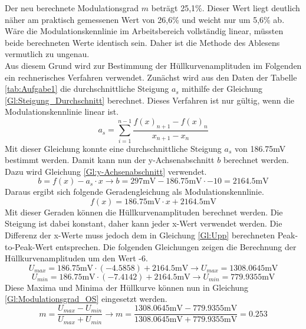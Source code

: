 \documentclass[12pt]{scrartcl}
\begin{document}
Der neu berechnete Modulationsgrad $m$ beträgt 25,1\%. Dieser Wert liegt deutlich näher am praktisch gemessenen Wert von 26,6\% und weicht nur um 5,6\% ab.\\
Wäre die Modulationskennlinie im Arbeitsbereich vollständig linear, müssten beide berechneten Werte identisch sein. 
Daher ist die Methode des Ablesens vermutlich zu ungenau. \\
Aus diesem Grund wird zur Bestimmung der Hüllkurvenamplituden im Folgenden ein rechnerisches Verfahren verwendet. 
Zunächst wird aus den Daten der Tabelle \ref{tab:Aufgabe1} die durchschnittliche Steigung $a_s$ mithilfe der Gleichung \ref{Gl:Steigung_Durchschnitt} berechnet.
Dieses Verfahren ist nur gültig, wenn die Modulationskennlinie linear ist.
\begin{equation}
    a_s=\sum_{i=1}^{n-1} \frac{f(x)_{n+1} - f(x)_n}{x_{n+1} - x_n}
    \label{Gl:Steigung_Durchschnitt}
\end{equation}
Mit dieser Gleichung konnte eine durchschnittliche Steigung $a_s$ von 186.75mV bestimmt werden. 
Damit kann nun der y-Achsenabschnitt $b$ berechnet werden. 
Dazu wird Gleichung \ref{Gl:y-Achsenabschnitt} verwendet.
\begin{equation}
    b = f(x) - a_s \cdot x \rightarrow b =  297\text{mV} - 186.75\text{mV} \cdot -10 = 2164.5 \text{mV}
    \label{Gl:y-Achsenabschnitt}
\end{equation}
Daraus ergibt sich folgende Geradengleichung als Modulationskennlinie.
\begin{equation*}
    f(x) = 186.75\text{mV} \cdot x + 2164.5\text{mV}
\end{equation*}
Mit dieser Geraden können die Hüllkurvenamplituden berechnet werden.
Die Steigung ist dabei konstant, daher kann jeder x-Wert verwendet werden. 
Die Differenz der x-Werte muss jedoch dem in Gleichung \ref{Gl:Upp} berechneten Peak-to-Peak-Wert entsprechen.
Die folgenden Gleichungen zeigen die Berechnung der Hüllkurvenamplituden um den Wert -6.
\begin{equation*}
    U_{max}= 186.75\text{mV} \cdot \left(-4.5858\right) + 2164.5\text{mV} \rightarrow U_{max}= 1308.0645\text{mV}
\end{equation*}
\begin{equation*}
    U_{min}= 186.75\text{mV} \cdot \left(-7.4142\right) + 2164.5\text{mV} \rightarrow U_{min}= 779.9355\text{mV}
\end{equation*}
Diese Maxima und Minima der Hüllkurve können nun in Gleichung \ref{Gl:Modulationsgrad_OS} eingesetzt werden.
\begin{equation*}
    m=\frac{U_{max}-U_{min}}{U_{max}+U_{min}}\rightarrow    m=\frac{1308.0645\text{mV}-779.9355\text{mV}}{1308.0645\text{mV}+779.9355\text{mV}}= 0.253
\end{equation*}
\end{document}
